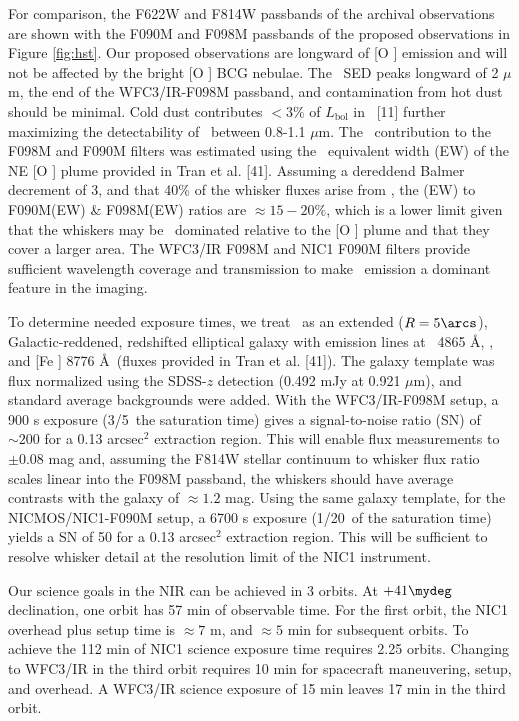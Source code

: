 \documentclass[12pt]{article}
\begin{document}
For comparison, the F622W and F814W passbands of the archival
observations are shown with the F090M and F098M passbands of the
proposed observations in Figure \ref{fig:hst}.  Our proposed
observations are longward of [O ] emission and will not be
affected by the bright [O ] BCG nebulae. The \irs\ SED peaks
longward of 2 $\mu$m, the end of the WFC3/IR-F098M passband, and
contamination from hot dust should be minimal. Cold dust contributes
$< 3\%$ of $L_{\mathrm{bol}}$ in \irs\ [11] further maximizing the
detectability of \halpha\ between 0.8-1.1 $\mu$m. The
\halpha\ contribution to the F098M and F090M filters was estimated
using the \hbeta\ equivalent width (EW) of the NE [O ] plume
provided in Tran et al. [41]. Assuming a dereddend Balmer decrement of
3, and that 40\% of the whisker fluxes arise from \halpha, the
\halpha(EW) to F090M(EW) \& F098M(EW) ratios are $\approx 15-20\%$,
which is a lower limit given that the whiskers may be
\halpha\ dominated relative to the [O ] plume and that they
cover a larger area. The WFC3/IR F098M and NIC1 F090M filters provide
sufficient wavelength coverage and transmission to make
\halpha\ emission a dominant feature in the imaging.

To determine needed exposure times, we treat \irs\ as an extended ($R
= 5\arcs$), Galactic-reddened, redshifted elliptical galaxy with
emission lines at \hbeta\ 4865 \AA, \oiii, and [Fe ] 8776
\AA\ (fluxes provided in Tran et al. [41]). The galaxy template was
flux normalized using the SDSS-$z$ detection (0.492 mJy at 0.921
$\mu$m), and standard average backgrounds were added. With the
WFC3/IR-F098M setup, a 900 s exposure (3/5\ths\ the saturation time)
gives a signal-to-noise ratio (SN) of $\sim 200$ for a 0.13 arcsec$^2$
extraction region. This will enable flux measurements to $\pm 0.08$
mag and, assuming the F814W stellar continuum to whisker flux ratio
scales linear into the F098M passband, the whiskers should have
average contrasts with the galaxy of $\approx 1.2$ mag. Using the same
galaxy template, for the NICMOS/NIC1-F090M setup, a 6700 s exposure
(1/20\ths\ of the saturation time) yields a SN of 50 for a 0.13
arcsec$^2$ extraction region. This will be sufficient to resolve
whisker detail at the resolution limit of the NIC1 instrument.

Our science goals in the NIR can be achieved in 3 orbits. At
$+41\mydeg$ declination, one orbit has 57 min of observable time. For
the first orbit, the NIC1 overhead plus setup time is $\approx 7$ m,
and $\approx 5$ min for subsequent orbits. To achieve the 112 min of
NIC1 science exposure time requires 2.25 orbits. Changing to WFC3/IR
in the third orbit requires 10 min for spacecraft maneuvering, setup,
and overhead. A WFC3/IR science exposure of 15 min leaves 17 min in
the third orbit.\\
\end{document}
